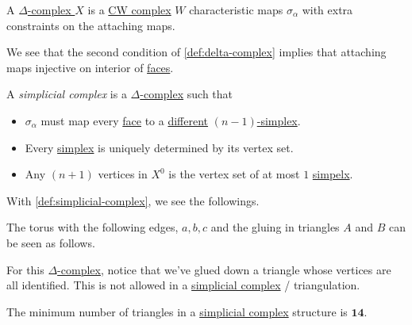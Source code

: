 \begin{exercise}
	A \hyperref[def:delta-complex]{\(\Delta\)-complex } \(X\) is a \hyperref[def:CW-Complex]{CW complex} \(W\) characteristic maps \(\sigma _\alpha \)
	with extra constraints on the attaching maps.
\end{exercise}
\begin{note}
	We see that the second condition of \autoref{def:delta-complex} implies that attaching maps injective on interior of \hyperref[def:face]{faces}.
\end{note}

\begin{definition}\label{def:simplicial-complex}
	A \emph{simplicial complex} is a \hyperref[def:delta-complex]{\(\Delta \)-complex} such that
	\begin{itemize}
		\item \(\sigma _\alpha \) must map every \hyperref[def:face]{face} to a \underline{different} \hyperref[def:standard-simplex]{\((n-1)\)-simplex}.
		\item Every \hyperref[def:standard-simplex]{simplex} is uniquely determined by its vertex set.
		\item Any \((n+1)\) vertices in \(X^0\) is the vertex set of at most \(1\) \hyperref[def:standard-simplex]{simpelx}.
	\end{itemize}
\end{definition}
\begin{remark}
	With \autoref{def:simplicial-complex}, we see the followings.
	\begin{figure}[H]
		\centering
		\label{fig:rmk:simplicial-complex}
	\end{figure}
\end{remark}

\begin{eg}
	The torus with the following edges, \(a, b, c\) and the gluing in triangles \(A\) and \(B\) can be seen as follows.
	\begin{figure}[H]
		\centering
		\label{fig:eg:constructing-torus-simplicial}
	\end{figure}
	For this \hyperref[def:delta-complex]{\(\Delta \)-complex}, notice that we've glued down a triangle whose vertices are all
	identified. This is not allowed in a \hyperref[def:simplicial-complex]{simplicial complex} / triangulation.

	\begin{remark}
		The minimum number of triangles in a \hyperref[def:simplicial-complex]{simplicial complex} structure is \(\bm{14}\).
	\end{remark}
\end{eg}